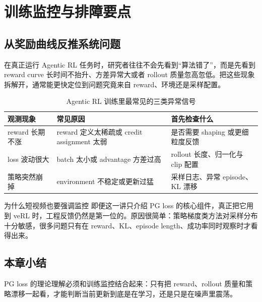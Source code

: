 \section{训练监控与排障要点}
\subsection{从奖励曲线反推系统问题}
在真正运行 Agentic RL 任务时，研究者往往不会先看到“算法错了”，而是先看到 reward curve 长时间不抬升、方差异常大或者 rollout 质量忽高忽低。把这些现象拆解开，通常能更快定位到问题究竟来自 reward、环境还是采样配置。

\begin{table}[H]
\centering
\begin{tabular}{p{3.5cm}p{5cm}p{4.5cm}}
\toprule
观测现象 & 常见原因 & 首先检查什么 \\
\midrule
reward 长期不涨 & reward 定义太稀疏或 credit assignment 太弱 & 是否需要 shaping 或更细粒度反馈 \\
loss 波动很大 & batch 太小或 advantage 方差过高 & rollout 长度、归一化与 clip 配置 \\
策略突然崩掉 & environment 不稳定或更新过猛 & 采样日志、异常 episode、KL 漂移 \\
\bottomrule
\end{tabular}
\caption{Agentic RL 训练里最常见的三类异常信号}
\end{table}

\begin{knowledgebox}{为什么短视频也要强调监控}
即便这一讲只介绍 PG loss 的核心组件，真正把它用到 veRL 时，工程反馈仍然是第一位的。原因很简单：策略梯度类方法对采样分布十分敏感，很多问题只有在 reward、KL、episode length、成功率同时观察时才看得出来。
\end{knowledgebox}

\subsection{本章小结}
PG loss 的理论理解必须和训练监控结合起来：只有把 reward、rollout 质量和策略漂移一起看，才能判断当前更新到底是在学习，还是只是在噪声里震荡。

\newpage
